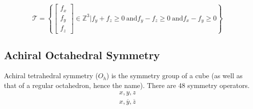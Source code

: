 \documentclass[acmtog]{acmart}
\begin{document}
\begin{equation}
  \mathcal{T} = \left\{ \begin{bmatrix} f_x \\ f_y \\ f_z \end{bmatrix} \in \mathbb{Z}^3 | f_y + f_z \geq 0 \: \text{and} f_y - f_z \geq 0 \: \text{and} f_x - f_y \geq 0 \right\}
\end{equation}

\subsection{Achiral Octahedral Symmetry}
Achiral tetrahedral symmetry ($O_h$) is the symmetry group of a cube (as well as that of a regular octahedron, hence the name). There are 48 symmetry operators.
\begin{equation}
  \begin{split}
    x, y, z \\
    x, \overline{y}, \overline{z} \\
  \end{split}
\end{equation}
\end{document}
